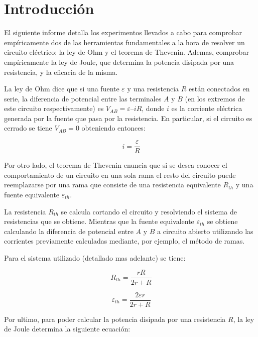 \documentclass[11pt,a4paper]{article}
\begin{document}
\section{Introducción}\label{sec:intro}

El siguiente informe detalla los experimentos llevados a cabo para comprobar empíricamente dos de las herramientas fundamentales a la hora de resolver un circuito eléctrico: la ley de Ohm y el teorema de Thevenin. Ademas, comprobar empíricamente la ley de Joule, que determina la potencia disipada por una resistencia, y la eficacia de la misma.

La ley de Ohm dice que si una fuente $\varepsilon$ y una resistencia $R$ están conectados en serie, la diferencia de potencial entre las terminales $A$ y $B$ (en los extremos de este circuito respectivamente) es $V_{AB} = \varepsilon –iR$, donde $i$ es la corriente eléctrica generada por la fuente que pasa por la resistencia. En particular, si el circuito es cerrado se tiene $V_{AB}=0$ obteniendo entonces:

\begin{equation}\label{Ohm}
\ i= \frac{\varepsilon}{R}
\end{equation}

Por otro lado, el teorema de Thevenin enuncia que si se desea conocer el comportamiento de un circuito en una sola rama el resto del circuito puede reemplazarse por una rama que consiste de una resistencia equivalente $R_{th}$ y una fuente equivalente $\varepsilon_{th}$.

La resistencia $R_{th}$ se calcula cortando el circuito y resolviendo el sistema de resistencias que se obtiene. Mientras que la fuente equivalente $\varepsilon_{th}$ se obtiene calculando la diferencia de potencial entre $A$ y $B$ a circuito abierto utilizando las corrientes previamente calculadas mediante, por ejemplo, el método de ramas.

Para el sistema utilizado (detallado mas adelante) se tiene:

\begin{equation}\label{Rth}
\ R_{th}= \frac{rR}{2r+R}
\end{equation}

\begin{equation}\label{Eth}
\ \varepsilon_{th}= \frac{2\varepsilon r}{2r+R}
\end{equation}

Por ultimo, para poder calcular la potencia disipada por una resistencia $R$, la ley de Joule determina la siguiente ecuación:
\end{document}
